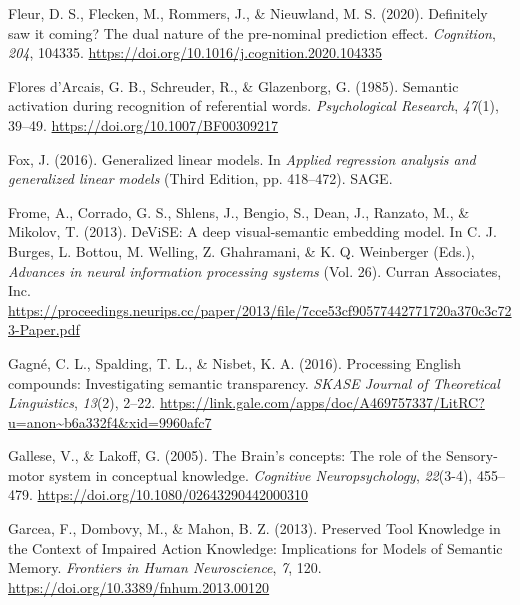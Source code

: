 \documentclass[
  12pt,
  man,floatsintext]{apa7}
\newlength{\cslhangindent}
\newlength{\cslentryspacingunit} %
\newenvironment{CSLReferences}[2] %
 {%
  \setlength{\parindent}{0pt}
  \ifodd #1
  \let\oldpar\par
  \def\par{\hangindent=\cslhangindent\oldpar}
  \fi
  \setlength{\parskip}{#2\cslentryspacingunit}
 }%
 {}
\begin{document}
\begin{CSLReferences}{1}{0}
\leavevmode{}%
Fleur, D. S., Flecken, M., Rommers, J., \& Nieuwland, M. S. (2020). Definitely saw it coming? {The} dual nature of the pre-nominal prediction effect. \emph{Cognition}, \emph{204}, 104335. \url{https://doi.org/10.1016/j.cognition.2020.104335}

\leavevmode{}%
Flores d'Arcais, G. B., Schreuder, R., \& Glazenborg, G. (1985). Semantic activation during recognition of referential words. \emph{Psychological Research}, \emph{47}(1), 39--49. \url{https://doi.org/10.1007/BF00309217}

\leavevmode{}%
Fox, J. (2016). Generalized linear models. In \emph{Applied regression analysis and generalized linear models} (Third Edition, pp. 418--472). {SAGE}.

\leavevmode{}%
Frome, A., Corrado, G. S., Shlens, J., Bengio, S., Dean, J., Ranzato, M., \& Mikolov, T. (2013). {DeViSE}: {A} deep visual-semantic embedding model. In C. J. Burges, L. Bottou, M. Welling, Z. Ghahramani, \& K. Q. Weinberger (Eds.), \emph{Advances in neural information processing systems} (Vol. 26). {Curran Associates, Inc.} \url{https://proceedings.neurips.cc/paper/2013/file/7cce53cf90577442771720a370c3c723-Paper.pdf}

\leavevmode{}%
Gagné, C. L., Spalding, T. L., \& Nisbet, K. A. (2016). Processing {English} compounds: {Investigating} semantic transparency. \emph{SKASE Journal of Theoretical Linguistics}, \emph{13}(2), 2--22. \url{https://link.gale.com/apps/doc/A469757337/LitRC?u=anon~b6a332f4\&xid=9960afc7}

\leavevmode{}%
Gallese, V., \& Lakoff, G. (2005). The {Brain}'s concepts: The role of the {Sensory-motor} system in conceptual knowledge. \emph{Cognitive Neuropsychology}, \emph{22}(3-4), 455--479. \url{https://doi.org/10.1080/02643290442000310}

\leavevmode{}%
Garcea, F., Dombovy, M., \& Mahon, B. Z. (2013). Preserved {Tool Knowledge} in the {Context} of {Impaired Action Knowledge}: {Implications} for {Models} of {Semantic Memory}. \emph{Frontiers in Human Neuroscience}, \emph{7}, 120. \url{https://doi.org/10.3389/fnhum.2013.00120}


\end{CSLReferences}
\end{document}
